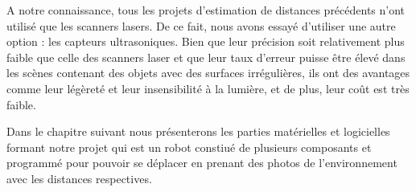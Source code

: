 A notre connaissance, tous les projets d'estimation de distances précédents
n'ont utilisé que les scanners lasers. De ce fait, nous avons essayé d'utiliser
une autre option : les capteurs ultrasoniques. Bien que leur précision soit
relativement plus faible que celle des scanners laser et que leur taux d'erreur
puisse être élevé dans les scènes contenant des objets avec des surfaces
irrégulières, ils ont des avantages comme leur légèreté et leur insensibilité
à la lumière, et de plus, leur coût est très faible.

Dans le chapitre suivant nous présenterons les parties matérielles et logicielles
formant notre projet qui est un robot constiué de plusieurs composants et
programmé pour pouvoir se déplacer en prenant des photos de l'environnement
avec les distances respectives.

